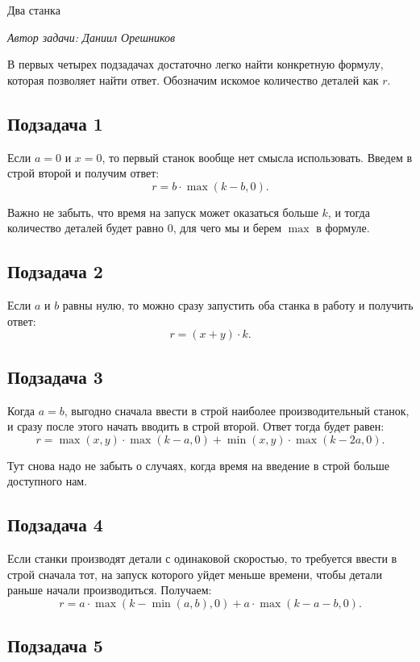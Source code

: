 \begin{tutorial}{Два станка}

\medskip
\textit{Автор задачи: Даниил Орешников}
\medskip

В первых четырех подзадачах достаточно легко найти конкретную формулу, которая позволяет найти ответ. Обозначим искомое количество деталей как $r$.

\subsection*{Подзадача 1}
Если $a = 0$ и $x = 0$, то первый станок вообще нет смысла использовать. Введем в строй второй и получим ответ: $$r = b \cdot \max(k - b, 0).$$

Важно не забыть, что время на запуск может оказаться больше $k$, и тогда количество деталей будет равно $0$, для чего мы и берем $\max$ в формуле.

\subsection*{Подзадача 2}
Если $a$ и $b$ равны нулю, то можно сразу запустить оба станка в работу и получить ответ: 
$$r = (x + y) \cdot k.$$

\subsection*{Подзадача 3}
Когда $a = b$, выгодно сначала ввести в строй наиболее производительный станок, и сразу после этого начать вводить в строй второй. Ответ тогда будет равен: 
$$r = \max(x, y) \cdot \max(k - a, 0) + \min(x, y) \cdot \max(k - 2a, 0).$$ 

Тут снова надо не забыть о случаях, когда время на введение в строй больше доступного нам.

\subsection*{Подзадача 4}

Если станки производят детали с одинаковой скоростью, то требуется ввести в строй сначала тот, на запуск которого уйдет меньше времени, чтобы детали раньше начали производиться. Получаем: 
$$r = a \cdot \max(k - \min(a, b), 0) + a \cdot \max(k - a - b, 0).$$

\subsection*{Подзадача 5}


\end{tutorial}
